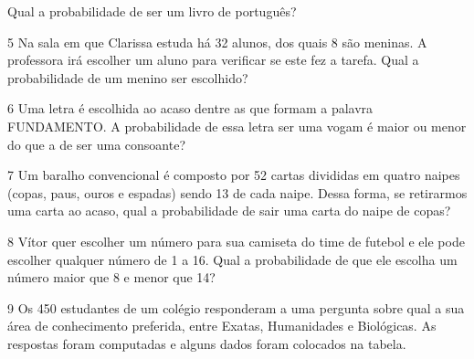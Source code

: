 \begin{multicols}{2}
\begin{escolha}
\item  Qual a probabilidade de ser um livro de português?

\end{escolha}

\num{5} Na sala em que Clarissa estuda há 32 alunos, dos quais 8 são meninas. A
professora irá escolher um aluno para verificar se este fez a tarefa.
Qual a probabilidade de um menino ser escolhido?





\num{6} Uma letra é escolhida ao acaso dentre as que formam a palavra
FUNDAMENTO. A probabilidade de essa letra ser uma vogam é maior ou menor do que a de ser uma consoante?





\num{7} Um baralho convencional é composto por 52 cartas divididas em quatro
naipes (copas, paus, ouros e espadas) sendo 13 de cada naipe. Dessa
forma, se retirarmos uma carta ao acaso, qual a probabilidade de sair
uma carta do naipe de copas?



\hfill

\num{8} Vítor quer escolher um número para sua camiseta do time de futebol e ele
pode escolher qualquer número de 1 a 16. Qual a probabilidade de que ele
escolha um número maior que 8 e menor que 14?



\hfill

\num{9} Os 450 estudantes de um colégio responderam a uma pergunta sobre qual a
sua área de conhecimento preferida, entre Exatas, Humanidades e
Biológicas. As respostas foram computadas e alguns dados foram colocados
na tabela.


\end{multicols}
